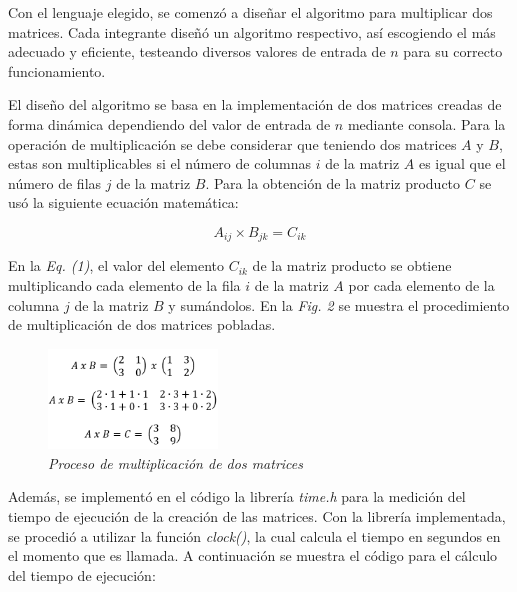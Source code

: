 \documentclass[11pt, twocolumn]{llncs}
\begin{document}
Con el lenguaje elegido, se comenzó a diseñar el algoritmo para multiplicar dos matrices. Cada integrante diseñó un algoritmo respectivo, así escogiendo el más adecuado y eficiente, testeando diversos valores de entrada de $n$ para su correcto funcionamiento.

El diseño del algoritmo se basa en la implementación de dos matrices creadas de forma dinámica dependiendo del valor de entrada de $n$ mediante consola. Para la operación de multiplicación se debe considerar que teniendo dos matrices $A$ y $B$, estas son multiplicables si el número de columnas $i$ de la matriz $A$ es igual que el número de filas $j$ de la matriz $B$. Para la obtención de la matriz producto $C$ se usó la siguiente ecuación matemática:

\begin{equation}
A_{ij} \times B_{jk} = C_{ik}
\end{equation}

En la \textit{Eq. (1)}, el valor del elemento $C_{ik}$ de la matriz producto se obtiene multiplicando cada elemento de la fila $i$ de la matriz $A$ por cada elemento de la columna $j$ de la matriz $B$ y sumándolos. En la \textit{Fig. 2} se muestra el procedimiento de multiplicación de dos matrices pobladas.

\begin{figure}[H]
\caption{\textit{\label{fig:multiplicacion}Proceso de multiplicación de dos matrices}}
\centering
\includegraphics[width=0.4\textwidth]{imagenes/multiplicacion.png}
\end{figure}

Además, se implementó en el código la librería \textit{time.h} para la medición del tiempo de ejecución de la creación de las matrices. Con la librería implementada, se procedió a utilizar la función \textit{clock()}, la cual calcula el tiempo en segundos en el momento que es llamada. A continuación se muestra el código para el cálculo del tiempo de ejecución:
\end{document}
